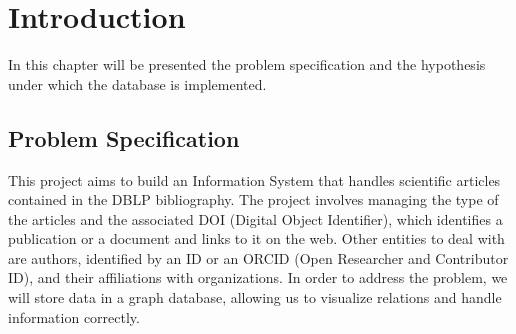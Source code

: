 \documentclass{Configuration_Files/PoliMi3i_thesis}
\begin{document}


\pagestyle{empty} %
\frontmatter %


\startpreamble
\setcounter{page}{1} %


\thispagestyle{empty}
\tableofcontents %
\thispagestyle{empty}
\cleardoublepage

\mainmatter %

\chapter{Introduction}
\label{ch:introduction}%

In this chapter will be presented the problem specification and the hypothesis under which the database is implemented.

\section{Problem Specification}
\label{sec:prob_specs}
This project aims to build an Information System that handles scientific articles contained in the DBLP
bibliography. The project involves managing the type of the articles and the associated DOI (Digital Object Identifier),
which identifies a publication or a document and links to it on the web. Other entities to deal with are authors, identified by
an ID or an ORCID (Open Researcher and Contributor ID), and their affiliations with organizations. In order to address the
problem, we will store data in a graph database, allowing us to visualize relations and handle information correctly.
\end{document}
